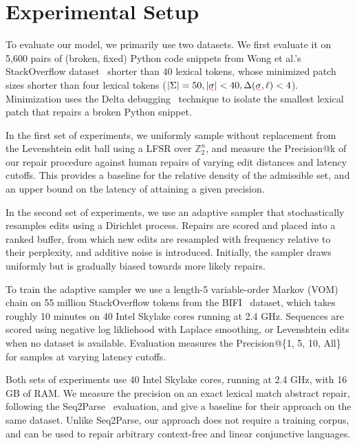 \documentclass[sigplan,review,anonymous,acmsmall]{acmart}\settopmatter{printfolios=false,printccs=false,printacmref=false}
\begin{document}
\section{Experimental Setup}\label{sec:experiments}

To evaluate our model, we primarily use two datasets. We first evaluate it on 5,600 pairs of (broken, fixed) Python code snippets from Wong et al.'s StackOverflow dataset~\cite{wong2019syntax} shorter than 40 lexical tokens, whose minimized patch sizes shorter than four lexical tokens ($|\Sigma| = 50, |\err{\sigma}| < 40, \Delta(\err{\sigma}, \ell) < 4$). Minimization uses the Delta debugging~\cite{zeller2002isolating} technique to isolate the smallest lexical patch that repairs a broken Python snippet.

In the first set of experiments, we uniformly sample without replacement from the Levenshtein edit ball using a LFSR over $\mathbb{Z}_2^n$, and measure the Precision@k of our repair procedure against human repairs of varying edit distances and latency cutoffs. This provides a baseline for the relative density of the admissible set, and an upper bound on the latency of attaining a given precision.

In the second set of experiments, we use an adaptive sampler that stochastically resamples edits using a Dirichlet process. Repairs are scored and placed into a ranked buffer, from which new edits are resampled with frequency relative to their perplexity, and additive noise is introduced. Initially, the sampler draws uniformly but is gradually biased towards more likely repairs.

To train the adaptive sampler we use a length-5 variable-order Markov (VOM) chain on 55 million StackOverflow tokens from the BIFI~\cite{yasunaga2021break} dataset, which takes roughly 10 minutes on 40 Intel Skylake cores running at 2.4 GHz. Sequences are scored using negative log likliehood with Laplace smoothing, or Levenshtein edits when no dataset is available. Evaluation measures the Precision@\{1, 5, 10, All\} for samples at varying latency cutoffs.

Both sets of experiments use 40 Intel Skylake cores, running at 2.4 GHz, with 16 GB of RAM. We measure the precision on an exact lexical match abstract repair, following the Seq2Parse~\cite{sakkas2022seq2parse} evaluation, and give a baseline for their approach on the same dataset. Unlike Seq2Parse, our approach does not require a training corpus, and can be used to repair arbitrary context-free and linear conjunctive languages.
\end{document}
